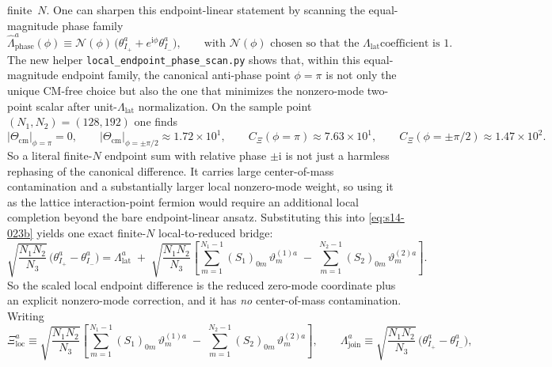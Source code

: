 \documentclass[11pt]{article}
\numberwithin{equation}{section}
\newcommand{\ii}{\mathrm{i}}
\begin{document}
finite~$N$.
One can sharpen this endpoint-linear statement by scanning the equal-magnitude
phase family
\begin{equation}
\label{eq:s14-023c5}
\widehat\Lambda_{\mathrm{phase}}^a(\phi)
\equiv
\mathcal{N}(\phi)\,
\bigl(\theta_{I_+}^a+e^{\ii\phi}\theta_{I_-}^a\bigr),
\qquad
\text{with $\mathcal{N}(\phi)$ chosen so that the $\Lambda_{\mathrm{lat}}$
coefficient is $1$.}
\end{equation}
The new helper \texttt{local\_endpoint\_phase\_scan.py} shows that, within this
equal-magnitude endpoint family, the canonical anti-phase point
$\phi=\pi$ is not only the unique CM-free choice but also the one that
minimizes the nonzero-mode two-point scalar after unit-$\Lambda_{\mathrm{lat}}$
normalization. On the sample point $(N_1,N_2)=(128,192)$ one finds
\begin{equation}
\label{eq:s14-023c6}
\bigl|\Theta_{\mathrm{cm}}\bigr|_{\phi=\pi}=0,
\qquad
\bigl|\Theta_{\mathrm{cm}}\bigr|_{\phi=\pm \pi/2}\approx 1.72\times 10^1,
\qquad
C_\Xi(\phi=\pi)\approx 7.63\times 10^1,
\qquad
C_\Xi(\phi=\pm\pi/2)\approx 1.47\times 10^2.
\end{equation}
So a literal finite-$N$ endpoint sum with relative phase $\pm\ii$ is not just
a harmless rephasing of the canonical difference. It carries large
center-of-mass contamination and a substantially larger local nonzero-mode
weight, so using it as the lattice interaction-point fermion would require an
additional local completion beyond the bare endpoint-linear ansatz.
Substituting this into \eqref{eq:s14-023b} yields one exact finite-$N$ local-to-reduced bridge:
\begin{equation}
\label{eq:s14-023d}
\sqrt{\frac{N_1N_2}{N_3}}\,
\bigl(\theta_{I_+}^a-\theta_{I_-}^a\bigr)
=
\Lambda_{\mathrm{lat}}^a
\;+\;
\sqrt{\frac{N_1N_2}{N_3}}
\left[
\sum_{m=1}^{N_1-1}(S_1)_{0m}\,\vartheta_m^{(1)a}
\;-\;
\sum_{m=1}^{N_2-1}(S_2)_{0m}\,\vartheta_m^{(2)a}
\right].
\end{equation}
So the scaled local endpoint difference is the reduced zero-mode coordinate plus an explicit nonzero-mode correction, and it has \emph{no} center-of-mass contamination. Writing
\begin{equation}
\label{eq:s14-023e}
\Xi_{\mathrm{loc}}^a
\equiv
\sqrt{\frac{N_1N_2}{N_3}}
\left[
\sum_{m=1}^{N_1-1}(S_1)_{0m}\,\vartheta_m^{(1)a}
\;-\;
\sum_{m=1}^{N_2-1}(S_2)_{0m}\,\vartheta_m^{(2)a}
\right],
\qquad
\Lambda_{\mathrm{join}}^a
\equiv
\sqrt{\frac{N_1N_2}{N_3}}\,
\bigl(\theta_{I_+}^a-\theta_{I_-}^a\bigr),
\end{equation}
\end{document}
